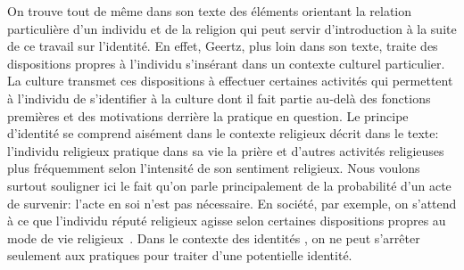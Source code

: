On trouve tout de même dans son texte des éléments orientant la relation particulière d'un individu et de la religion qui peut servir d'introduction à la suite de ce travail sur l'identité.
En effet, Geertz, plus loin dans son texte, traite des dispositions propres à l'individu s'insérant dans un contexte culturel particulier.
La culture transmet ces dispositions à effectuer certaines activités qui permettent à l'individu de s'identifier à la culture dont il fait partie au-delà des fonctions premières et des motivations derrière la pratique en question.
Le principe d'identité se comprend aisément dans le contexte religieux décrit dans le texte: l'individu religieux pratique dans sa vie la prière et d'autres activités religieuses plus fréquemment selon l'intensité de son sentiment religieux.
Nous voulons surtout souligner ici le fait qu'on parle principalement de la probabilité d'un acte de survenir: l'acte en soi n'est pas nécessaire.
En société, par exemple, on s'attend à ce que l'individu réputé religieux agisse selon certaines dispositions propres au mode de vie religieux~\citep[28--30]{Geertz1972}.
Dans le contexte des identités \lgbt{}, on ne peut s'arrêter seulement aux pratiques pour traiter d'une potentielle identité.

